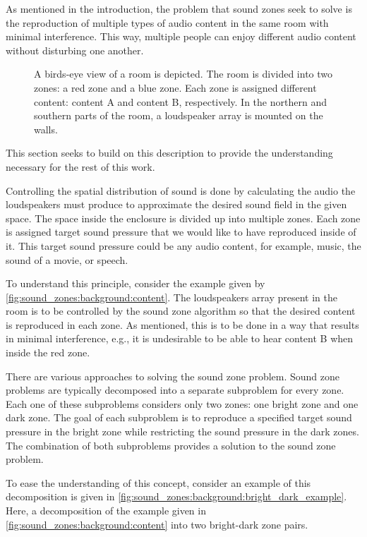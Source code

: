 As mentioned in the introduction, the problem that sound zones seek to solve is the reproduction
of multiple types of audio content in the same room with minimal interference.
This way, multiple people can enjoy different audio content without disturbing one another.

\begin{figure}[h]
    \centering
    \scalebox{1.0}{}
    \caption{
            A birds-eye view of a room is depicted.
            The room is divided into two zones: a red zone and a blue zone.
            Each zone is assigned different content: content A and content B, respectively.
            In the northern and southern parts of the room, a loudspeaker array is mounted on the walls.
        }
    \label{fig:sound_zones:background:content}
\end{figure}

This section seeks to build on this description to provide the understanding necessary for the rest of this work.

Controlling the spatial distribution of sound is done by calculating the audio the loudspeakers must produce to approximate 
the desired sound field in the given space.
The space inside the enclosure is divided up into multiple zones.
Each zone is assigned target sound pressure that we would like to have reproduced inside of it.
This target sound pressure could be any audio content, for example, music, the sound of a movie, or speech.

To understand this principle, consider the example given by \autoref{fig:sound_zones:background:content}.
The loudspeakers array present in the room is to be controlled by the sound zone algorithm so that the desired content is reproduced in each zone.
As mentioned, this is to be done in a way that results in minimal interference, e.g., it is undesirable
to be able to hear content B when inside the red zone.


There are various approaches to solving the sound zone problem.
Sound zone problems are typically decomposed into a separate subproblem for every zone.
Each one of these subproblems considers only two zones: one bright zone and one dark zone.
The goal of each subproblem is to reproduce a specified target sound pressure in the bright zone while restricting the sound pressure in the dark zones.
The combination of both subproblems provides a solution to the sound zone problem. 

To ease the understanding of this concept, consider an example of this decomposition is given in 
\autoref{fig:sound_zones:background:bright_dark_example}.
Here, a decomposition of the example given in \autoref{fig:sound_zones:background:content} into 
two bright-dark zone pairs.

